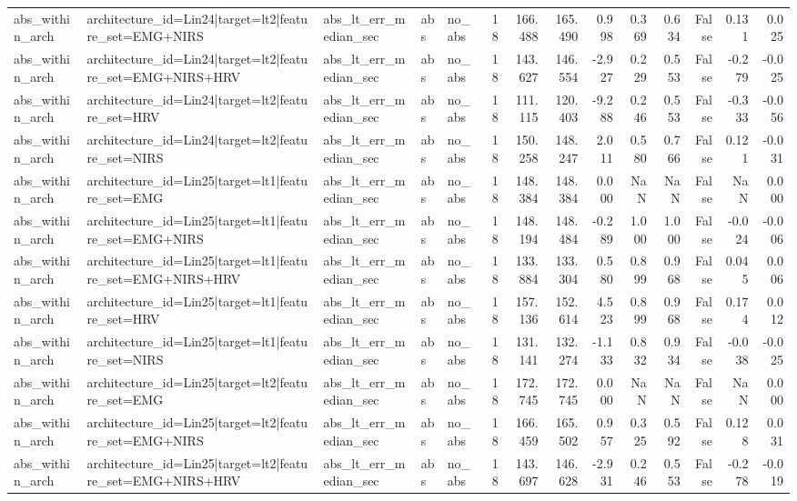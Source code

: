 \begin{table}
\begin{tabular}{lllllrrrrrrrrr}
abs_within_arch & architecture_id=Lin24|target=lt2|feature_set=EMG+NIRS & abs_lt_err_median_sec & abs & no_abs & 18 & 166.488 & 165.490 & 0.998 & 0.369 & 0.634 & False & 0.131 & 0.025 \\
abs_within_arch & architecture_id=Lin24|target=lt2|feature_set=EMG+NIRS+HRV & abs_lt_err_median_sec & abs & no_abs & 18 & 143.627 & 146.554 & -2.927 & 0.229 & 0.553 & False & -0.279 & -0.025 \\
abs_within_arch & architecture_id=Lin24|target=lt2|feature_set=HRV & abs_lt_err_median_sec & abs & no_abs & 18 & 111.115 & 120.403 & -9.288 & 0.246 & 0.553 & False & -0.333 & -0.056 \\
abs_within_arch & architecture_id=Lin24|target=lt2|feature_set=NIRS & abs_lt_err_median_sec & abs & no_abs & 18 & 150.258 & 148.247 & 2.011 & 0.580 & 0.766 & False & 0.121 & -0.031 \\
abs_within_arch & architecture_id=Lin25|target=lt1|feature_set=EMG & abs_lt_err_median_sec & abs & no_abs & 18 & 148.384 & 148.384 & 0.000 & NaN & NaN & False & NaN & 0.000 \\
abs_within_arch & architecture_id=Lin25|target=lt1|feature_set=EMG+NIRS & abs_lt_err_median_sec & abs & no_abs & 18 & 148.194 & 148.484 & -0.289 & 1.000 & 1.000 & False & -0.024 & -0.006 \\
abs_within_arch & architecture_id=Lin25|target=lt1|feature_set=EMG+NIRS+HRV & abs_lt_err_median_sec & abs & no_abs & 18 & 133.884 & 133.304 & 0.580 & 0.899 & 0.968 & False & 0.045 & 0.006 \\
abs_within_arch & architecture_id=Lin25|target=lt1|feature_set=HRV & abs_lt_err_median_sec & abs & no_abs & 18 & 157.136 & 152.614 & 4.523 & 0.899 & 0.968 & False & 0.174 & 0.012 \\
abs_within_arch & architecture_id=Lin25|target=lt1|feature_set=NIRS & abs_lt_err_median_sec & abs & no_abs & 18 & 131.141 & 132.274 & -1.133 & 0.832 & 0.934 & False & -0.038 & -0.025 \\
abs_within_arch & architecture_id=Lin25|target=lt2|feature_set=EMG & abs_lt_err_median_sec & abs & no_abs & 18 & 172.745 & 172.745 & 0.000 & NaN & NaN & False & NaN & 0.000 \\
abs_within_arch & architecture_id=Lin25|target=lt2|feature_set=EMG+NIRS & abs_lt_err_median_sec & abs & no_abs & 18 & 166.459 & 165.502 & 0.957 & 0.325 & 0.592 & False & 0.128 & 0.031 \\
abs_within_arch & architecture_id=Lin25|target=lt2|feature_set=EMG+NIRS+HRV & abs_lt_err_median_sec & abs & no_abs & 18 & 143.697 & 146.628 & -2.931 & 0.246 & 0.553 & False & -0.278 & -0.019 \\

\end{tabular}
\end{table}
